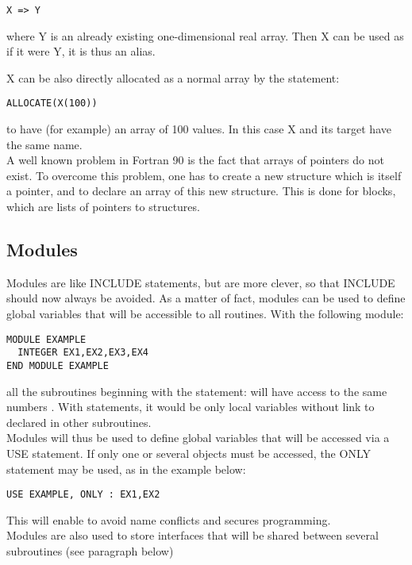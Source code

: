 \begin{lstlisting}[language=TelFortran]
X => Y
\end{lstlisting}
where Y is an already existing one-dimensional real array. Then X can be used as
if it were Y, it is thus an alias.

X can be also directly allocated as a normal array by the statement:
\begin{lstlisting}[language=TelFortran]
ALLOCATE(X(100))
\end{lstlisting}
to have (for example) an array of 100 values. In this case X and its target
have the same name.
\\
A well known problem in Fortran 90 is the fact that arrays of pointers do not
exist. To overcome this problem, one has to create a new structure which is
itself a pointer, and to declare an array of this new structure. This is done
for blocks, which are lists of pointers to  structures.

\subsection{Modules}

Modules are like INCLUDE statements, but are more clever, so that INCLUDE
should now always be avoided. As a matter of fact, modules can be used to
define global variables that will be accessible to all routines. With the
following module:

\begin{lstlisting}[language=TelFortran]
MODULE EXAMPLE
  INTEGER EX1,EX2,EX3,EX4
END MODULE EXAMPLE
\end{lstlisting}
all the subroutines beginning with the statement:  will
have access to the same numbers . With 
statements, it would be only local variables without link to
 declared in other subroutines.
\\
Modules will thus be used to define global variables that will be accessed via
a USE statement. If only one or several objects must be accessed, the ONLY
statement may be used, as in the example below:

\begin{lstlisting}[language=TelFortran]
USE EXAMPLE, ONLY : EX1,EX2
\end{lstlisting}
This will enable to avoid name conflicts and secures programming.
\\
Modules are also used to store interfaces that will be shared between several
subroutines (see paragraph below)

